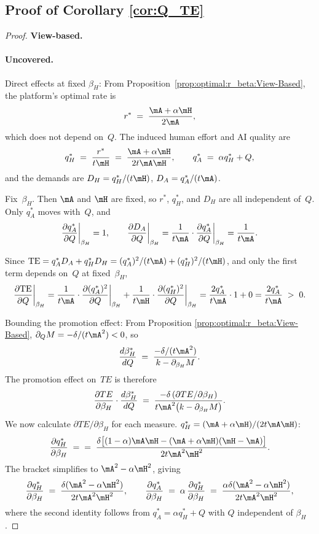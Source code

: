 \subsection*{Proof of Corollary \ref{cor:Q_TE}}
\begin{proof}
\textbf{View-based.}
\paragraph{Uncovered.}
Direct effects at fixed $\beta_H$:
From Proposition~\ref{prop:optimal:r_beta:View-Based}, the platform's optimal rate is
\[
r^* \;=\; \frac{\mA + \alpha \mH}{2\mA},
\]
which does not depend on~$Q$. The induced human effort and AI quality are
\[
q_H^* \;=\; \frac{r^*}{t\mH} \;=\; \frac{\mA + \alpha \mH}{2t\mA\mH}, 
\qquad
q_A^* \;=\; \alpha q_H^* + Q,
\]
and the demands are $D_H = q_H^*/(t\mH)$, $D_A = q_A^*/(t\mA)$.

Fix~$\beta_H$. Then $\mA$ and $\mH$ are fixed, so $r^*$, $q_H^*$, and $D_H$ are all independent of~$Q$. Only $q_A^*$ moves with~$Q$, and
\[
\frac{\partial q_A^*}{\partial Q}\bigg|_{\beta_H} = 1,
\qquad
\frac{\partial D_A}{\partial Q}\bigg|_{\beta_H}
= \frac{1}{t\mA}\cdot\frac{\partial q_A^*}{\partial Q}\bigg|_{\beta_H}
= \frac{1}{t\mA}.
\]

Since $\text{TE} = q_A^* D_A + q_H^* D_H = (q_A^*)^2/(t\mA) + (q_H^*)^2/(t\mH)$, and only the first term depends on~$Q$ at fixed~$\beta_H$,
\begin{equation}\label{prop:Q_beta:dTEdQ}
\frac{\partial \text{TE}}{\partial Q}\bigg|_{\beta_H}
= \frac{1}{t\mA}\cdot \frac{\partial (q_A^*)^2}{\partial Q}\bigg|_{\beta_H}
+ \frac{1}{t\mH}\cdot \frac{\partial (q_H^*)^2}{\partial Q}\bigg|_{\beta_H}
= \frac{2 q_A^*}{t\mA}\cdot 1 + 0
= \frac{2 q_A^*}{t\mA} \;>\; 0.
\end{equation}


Bounding the promotion effect:
From Proposition \ref{prop:optimal:r_beta:View-Based}, $\partial_Q M = -\delta/(t\mA^2) < 0$, so
\[
\frac{d\beta_H^*}{dQ}
\;=\; \frac{-\delta/(t\mA^2)}{k - \partial_{\beta_H}M}.
\]
The promotion effect on~$TE$ is therefore
\[
\frac{\partial TE}{\partial\beta_H}\cdot\frac{d\beta_H^*}{dQ}
\;=\; \frac{-\delta\,(\partial TE/\partial\beta_H)}{t\mA^2\bigl(k - \partial_{\beta_H}M\bigr)}.
\]
We now calculate $\partial TE/\partial\beta_H$ for each measure. $q_H^*=(\mA+\alpha\mH)/(2t\mA\mH) $:
\[
\frac{\partial q_H^*}{\partial\beta_H}
\;=\;
\;=\; \frac{\delta\bigl[(1-\alpha)\mA\mH - (\mA + \alpha\mH)(\mH - \mA)\bigr]}{2t\mA^2\mH^2}.
\]
The bracket simplifies to $\mA^2 - \alpha\mH^2$, giving
\[
\frac{\partial q_H^*}{\partial\beta_H}
\;=\; \frac{\delta(\mA^2 - \alpha\mH^2)}{2t\mA^2\mH^2},
\qquad
\frac{\partial q_A^*}{\partial\beta_H}
\;=\; \alpha\,\frac{\partial q_H^*}{\partial\beta_H}
\;=\; \frac{\alpha\delta(\mA^2 - \alpha\mH^2)}{2t\mA^2\mH^2},
\]
where the second identity follows from $q_A^* = \alpha q_H^* + Q$ with $Q$ independent of $\beta_H$.



\end{proof}

